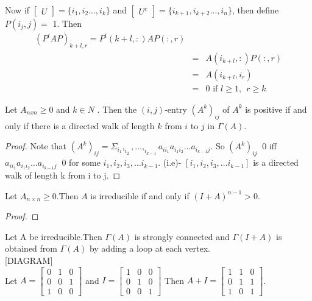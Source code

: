Now if $\begin{bmatrix}U\end{bmatrix}  = \{ i_{1} , i_{2} \ldots,i_{k} \}$
    and $\begin{bmatrix}U^{c}\end{bmatrix} = \{ i_{k+1} , i_{k+2} \ldots,i_{n} \}$,
    then define $ P(i_{j},j) = $ 1.
    Then
    \begin{eqnarray*}
     (P^{t}AP)_{k+l,r} = P^{t}(k+l,:) AP( : , r )\\
    &=&  A(i_{k+l},:) P( : , r )\\
    &=&  A(i_{k+l},i_{r})\\
    &=& 0    \text{ if } l \geq 1,~~ r\geq k
    \end{eqnarray*} 
\begin{proposition}
 Let $A_{nxn} \geq 0$ and $k \in N$ .
Then the $(i,j)$-entry $(A^{k})_{ij}$ of $A^{k}$ is positive if and only if there is a directed walk of length $k$ from $i$ to $j$ in $\Gamma(A)$.
\end{proposition}
\begin{proof}
  Note that 
$(A^{k})_{ij} = {\Sigma} _{i_{1}} , _{i_{2}} ,\ldots, _{i_{k-1}} a_{ii_{1}}  a_{{i_{1}i_{2}}}\ldots a_{{i_{k-1}{j}}}.$
So $(A^{k})_{ij}\> $ 0 iff  $a_{ii_{1}} a_{{i_{1}i_{2}}}\ldots a_{{i_{k-1}{j}}}\>$ 0 for some $ i_{1},i_{2},i_{3},\ldots i_{k-1}$.
(i.e)- $ [i_{1},i_{2},i_{3},\ldots i_{k-1}] $  is a directed walk of length k from i to j.
 
\end{proof}
 
     
\begin{proposition}
Let $A_{n\times n}\geq  0$.Then $A$ is irreducible if and only if $(I+A)^{n-1} >  0$.
 \end{proposition}
\begin{proof}
 
\end{proof}
Let A be irreducible.Then $\Gamma(A) $ is strongly connected and $\Gamma( I + A )$ is obtained from $\Gamma(A) $ by adding a 
loop at each vertex.\\

[DIAGRAM]\\

Let $A =\begin{bmatrix}0&1&0\\0&0&1\\1&0&0\end{bmatrix}$ 
and $I =\begin{bmatrix}1&0&0\\0&1&0\\0&0&1\end{bmatrix}$
Then $ A + I =\begin{bmatrix}1&1&0\\0&1&1\\1&0&1\end{bmatrix}$.

